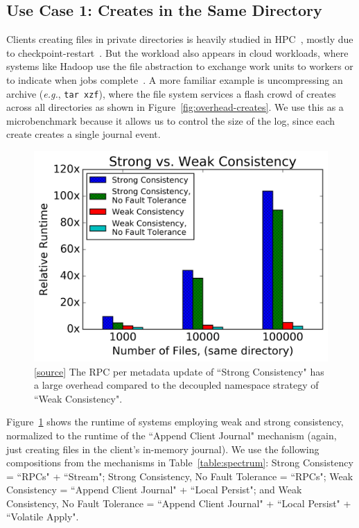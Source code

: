 \subsection{Use Case 1: Creates in the Same Directory}
\label{use-case-1}

Clients creating files in private directories is heavily studied in
HPC~\cite{weil:sc2004-dyn-metadata, ren:sc2014-indexfs, patil:fast2011-giga,
zheng:pdsw2014-batchfs, sevilla:sc15-mantle}, mostly due to
checkpoint-restart~\cite{bent_plfs_2009}.  But the workload also appears in
cloud workloads, where systems like Hadoop use the file abstraction to exchange
work units to workers or to indicate when jobs
complete~\cite{shvachko:login2012-hdfs-scalability}. A more familiar example is
uncompressing an archive ({\it e.g.}, \texttt{tar xzf}), where the file system
services a flash crowd of creates across all directories as shown in
Figure~\ref{fig:overhead-creates}.  We use this as a microbenchmark because it
allows us to control the size of the log, since each create creates a single
journal event.

\begin{figure}[tb]
\centering
\includegraphics[width=1.0\linewidth]{graphs/slowdown-strong-v-weak.png}
\caption{
[\href{https://...}{source}]
The RPC per metadata update of ``Strong Consistency" has a large
overhead compared to the decoupled namespace strategy of ``Weak
Consistency".\label{fig:slowdown-strong-weak}}
\end{figure}

Figure~\ref{fig:slowdown-strong-weak} shows the runtime of systems employing
weak and strong consistency, normalized to the runtime of the ``Append Client Journal"
mechanism (again, just creating files in the client's in-memory journal).  We
use the following compositions from the mechanisms in
Table~\ref{table:spectrum}:  Strong Consistency = ``RPCs" + ``Stream"; Strong
Consistency, No Fault Tolerance = ``RPCs"; Weak Consistency = ``Append Client Journal" +
``Local Persist"; and Weak Consistency, No Fault Tolerance = ``Append Client Journal" +
``Local Persist" + ``Volatile Apply".

